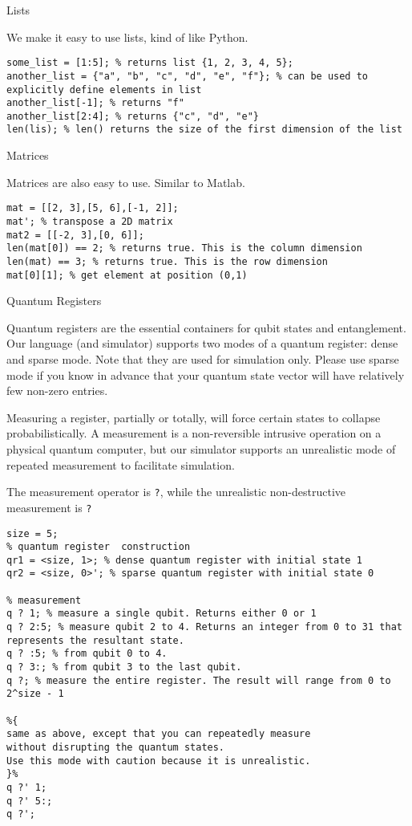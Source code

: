 \documentclass[]{article}
\begin{document}
Lists

We make it easy to use lists, kind of like Python.

\begin{verbatim}
some_list = [1:5]; % returns list {1, 2, 3, 4, 5};
another_list = {"a", "b", "c", "d", "e", "f"}; % can be used to explicitly define elements in list
another_list[-1]; % returns "f"
another_list[2:4]; % returns {"c", "d", "e"}
len(lis); % len() returns the size of the first dimension of the list
\end{verbatim}

Matrices

Matrices are also easy to use. Similar to Matlab.

\begin{verbatim}
mat = [[2, 3],[5, 6],[-1, 2]];
mat'; % transpose a 2D matrix
mat2 = [[-2, 3],[0, 6]];
len(mat[0]) == 2; % returns true. This is the column dimension
len(mat) == 3; % returns true. This is the row dimension
mat[0][1]; % get element at position (0,1)
\end{verbatim}

Quantum Registers

Quantum registers are the essential containers for qubit states and
entanglement. Our language (and simulator) supports two modes of a
quantum register: dense and sparse mode. Note that they are used for
simulation only. Please use sparse mode if you know in advance that your
quantum state vector will have relatively few non-zero entries.

Measuring a register, partially or totally, will force certain states to
collapse probabilistically. A measurement is a non-reversible intrusive
operation on a physical quantum computer, but our simulator supports an
unrealistic mode of repeated measurement to facilitate simulation.

The measurement operator is \texttt{?}, while the unrealistic
non-destructive measurement is \texttt{?\textquotesingle{}}

\begin{verbatim}
size = 5;
% quantum register  construction
qr1 = <size, 1>; % dense quantum register with initial state 1
qr2 = <size, 0>'; % sparse quantum register with initial state 0

% measurement
q ? 1; % measure a single qubit. Returns either 0 or 1
q ? 2:5; % measure qubit 2 to 4. Returns an integer from 0 to 31 that represents the resultant state.
q ? :5; % from qubit 0 to 4.
q ? 3:; % from qubit 3 to the last qubit. 
q ?; % measure the entire register. The result will range from 0 to 2^size - 1

%{
same as above, except that you can repeatedly measure 
without disrupting the quantum states. 
Use this mode with caution because it is unrealistic.
}%
q ?' 1;
q ?' 5:;
q ?';
\end{verbatim}
\end{document}
